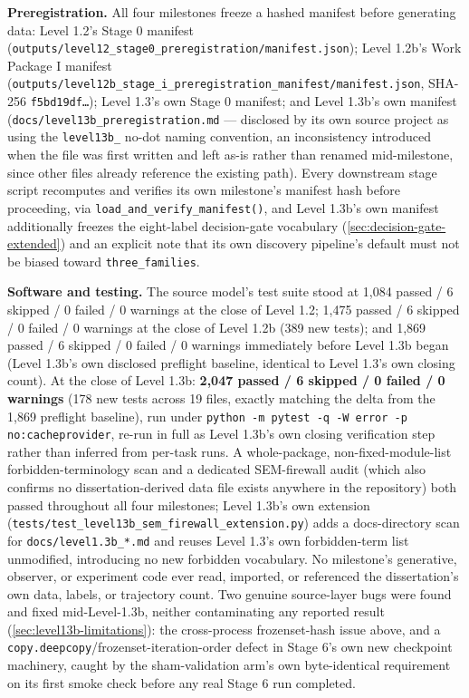 \textbf{Preregistration.} All four milestones freeze a hashed manifest
before generating data: Level 1.2's Stage 0 manifest
(\texttt{outputs/level12\_stage0\_preregistration/manifest.json}); Level
1.2b's Work Package I manifest
(\texttt{outputs/level12b\_stage\_i\_preregistration\_manifest/manifest.json},
SHA-256 \texttt{f5bd19df\ldots}); Level 1.3's own Stage 0 manifest; and
Level 1.3b's own manifest (\texttt{docs/level13b\_preregistration.md} ---
disclosed by its own source project as using the \texttt{level13b\_}
no-dot naming convention, an inconsistency introduced when the file was
first written and left as-is rather than renamed mid-milestone, since
other files already reference the existing path). Every downstream stage
script recomputes and verifies its own milestone's manifest hash before
proceeding, via \texttt{load\_and\_verify\_manifest()}, and Level 1.3b's
own manifest additionally freezes the eight-label decision-gate vocabulary
(\cref{sec:decision-gate-extended}) and an explicit note that its own
discovery pipeline's default must not be biased toward
\texttt{three\_families}.

\textbf{Software and testing.} The source model's test suite stood at
1,084 passed / 6 skipped / 0 failed / 0 warnings at the close of Level 1.2;
1,475 passed / 6 skipped / 0 failed / 0 warnings at the close of Level
1.2b (389 new tests); and 1,869 passed / 6 skipped / 0 failed / 0 warnings
immediately before Level 1.3b began (Level 1.3b's own disclosed preflight
baseline, identical to Level 1.3's own closing count). At the close of
Level 1.3b: \textbf{2,047 passed / 6 skipped / 0 failed / 0 warnings} (178
new tests across 19 files, exactly matching the delta from the 1,869
preflight baseline), run under \texttt{python -m pytest -q -W error -p
no:cacheprovider}, re-run in full as Level 1.3b's own closing verification
step rather than inferred from per-task runs. A whole-package,
non-fixed-module-list forbidden-terminology scan and a dedicated
SEM-firewall audit (which also confirms no dissertation-derived data file
exists anywhere in the repository) both passed throughout all four
milestones; Level 1.3b's own extension
(\texttt{tests/test\_level13b\_sem\_firewall\_extension.py}) adds a
docs-directory scan for \texttt{docs/level1.3b\_*.md} and reuses Level
1.3's own forbidden-term list unmodified, introducing no new forbidden
vocabulary. No milestone's generative, observer, or experiment code ever
read, imported, or referenced the dissertation's own data, labels, or
trajectory count. Two genuine source-layer bugs were found and fixed
mid-Level-1.3b, neither contaminating any reported result
(\cref{sec:level13b-limitations}): the cross-process frozenset-hash issue
above, and a \texttt{copy.deepcopy}/frozenset-iteration-order defect in
Stage 6's own new checkpoint machinery, caught by the sham-validation
arm's own byte-identical requirement on its first smoke check before any
real Stage 6 run completed.

